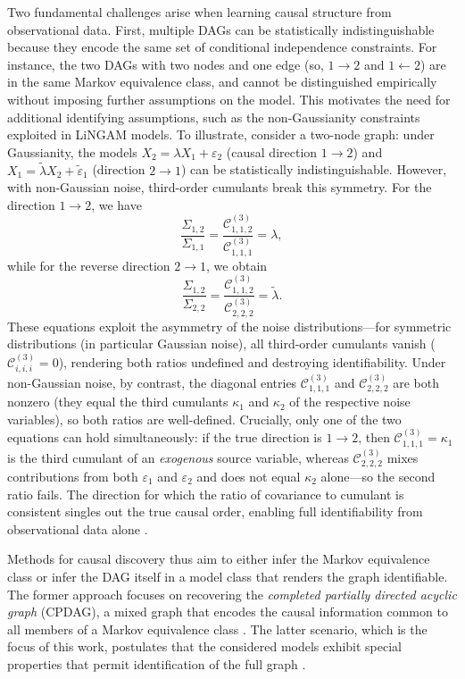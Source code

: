 \documentclass[11pt,a4paper]{article}
\numberwithin{equation}{section}
\begin{document}
Two fundamental challenges arise when learning causal structure from observational data. First, multiple DAGs can be statistically indistinguishable because they encode the same set of conditional independence constraints. For instance, the two DAGs with two nodes and one edge (so, $1 \to 2$ and $1 \leftarrow 2$) are in the same Markov equivalence class, and cannot be distinguished empirically without imposing further assumptions on the model. This motivates the need for additional identifying assumptions, such as the non-Gaussianity constraints exploited in LiNGAM models. To illustrate, consider a two-node graph: under Gaussianity, the models $X_2 = \lambda X_1 + \varepsilon_2$ (causal direction $1 \to 2$) and $X_1 = \tilde{\lambda} X_2 + \tilde{\varepsilon}_1$ (direction $2 \to 1$) can be statistically indistinguishable. However, with non-Gaussian noise, third-order cumulants break this symmetry. For the direction $1 \to 2$, we have
\[
\frac{\Sigma_{1,2}}{\Sigma_{1,1}} = \frac{\mathcal{C}^{(3)}_{1,1,2}}{\mathcal{C}^{(3)}_{1,1,1}} = \lambda,
\]
while for the reverse direction $2 \to 1$, we obtain
\[
\frac{\Sigma_{1,2}}{\Sigma_{2,2}} = \frac{\mathcal{C}^{(3)}_{1,1,2}}{\mathcal{C}^{(3)}_{2,2,2}} = \tilde{\lambda}.
\]
These equations exploit the asymmetry of the noise distributions—for
symmetric distributions (in particular Gaussian noise), all third-order
cumulants vanish ($\mathcal{C}^{(3)}_{i,i,i} = 0$), rendering both ratios
undefined and destroying identifiability.  Under non-Gaussian noise, by
contrast, the diagonal entries $\mathcal{C}^{(3)}_{1,1,1}$ and
$\mathcal{C}^{(3)}_{2,2,2}$ are both nonzero (they equal the third
cumulants $\kappa_1$ and $\kappa_2$ of the respective noise variables), so
both ratios are well-defined.  Crucially, only one of the two equations can
hold simultaneously: if the true direction is $1\to 2$, then
$\mathcal{C}^{(3)}_{1,1,1}=\kappa_1$ is the third cumulant of an
\emph{exogenous} source variable, whereas $\mathcal{C}^{(3)}_{2,2,2}$
mixes contributions from both $\varepsilon_1$ and $\varepsilon_2$ and does
not equal $\kappa_2$ alone—so the second ratio fails.  The direction for
which the ratio of covariance to cumulant is consistent singles out the
true causal order, enabling full identifiability from observational data
alone \citep{shimizu:hoyer:2006}.

Methods for causal discovery thus aim to either infer the Markov equivalence class or infer the DAG itself in a model class that renders the graph identifiable. The former approach focuses on recovering the \emph{completed partially directed acyclic graph} (CPDAG), a mixed graph that encodes the causal information common to all members of a Markov equivalence class \citep{meek:1995}. The latter scenario, which is the focus of this work, postulates that the considered models exhibit special properties that permit identification of the full graph \citep{shimizu:hoyer:2006}.
\end{document}
